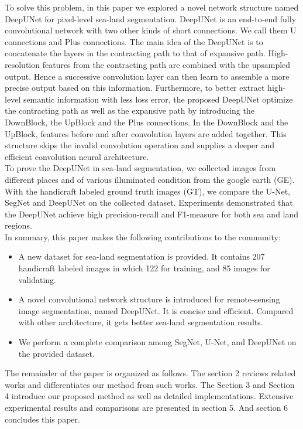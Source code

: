 \documentclass[conference]{IEEEtran}
\begin{document}
To solve this problem, in this paper we explored a novel network structure named DeepUNet for pixel-level sea-land segmentation. DeepUNet is an end-to-end fully convolutional network with two other kinds of short connections. We call them U connections and Plus connections.  The main idea of the DeepUNet is to concatenate the layers in the contracting path to that of  expansive path. High-resolution features from the contracting path are combined with the upsampled output. Hence a successive convolution layer can then learn to assemble a more precise output based on this information.  Furthermore, to better extract high-level semantic information with less loss error, the proposed DeepUNet optimize the contracting path as well as the expansive path by introducing the DownBlock, the UpBlock and the Plus connections. In the DownBlock and the UpBlock, features before and after convolution layers are added together. This structure skips the invalid convolution operation and supplies a deeper and efficient convolution neural architecture.\\

To prove the DeepUNet in sea-land segmentation, we collected images from different places and of various illuminated condition from the google earth (GE). With the handicraft labeled ground truth images (GT), we compare the U-Net, SegNet and DeepUNet on the collected dataset. Experiments demonstrated that the DeepUNet achieve high precision-recall and F1-measure for both sea and land regions.\\

In summary, this paper makes the following contributions to the community:
\begin{itemize}
\item A new dataset for sea-land segmentation is provided. It contains 207 handicraft labeled images in which 122 for training, and 85 images for validating.
\item A novel convolutional network structure is introduced for remote-sensing image segmentation, named DeepUNet.  It is concise and efficient. Compared with other architecture, it gets better sea-land segmentation results.
\item We perform a complete comparison among SegNet, U-Net, and DeepUNet on the provided dataset.\\
\end{itemize}

The remainder of the paper is organized as follows. The section 2 reviews related works and differentiates our method from such works. The Section 3 and Section 4 introduce our proposed method as well as detailed implementations.  Extensive experimental results and comparisons are presented in section 5. And section 6 concludes this paper.
\end{document}
